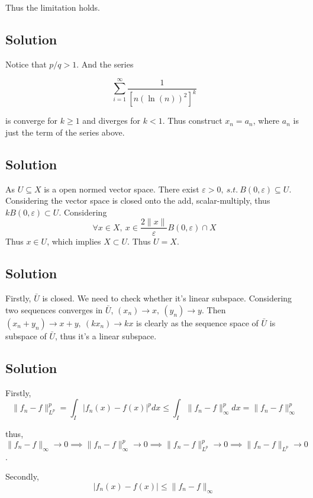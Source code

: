 \documentclass{article}
\begin{document}
Thus the limitation holds.

\subsection{Solution}
Notice that \(p/q > 1\). And the series

\[\sum_{i = 1}^\infty \frac{1}{[n(\ln(n))^2]^k}\]

is converge for \(k \ge 1\) and diverges for \(k < 1\). Thus construct \(x_n = a_n\), where \(a_n\) is just the term of the series above.


\subsection{Solution}
As \(U \subseteq X\) is a open normed vector space. There exist \(\varepsilon > 0,\ s.t.\ B(0, \varepsilon) \subseteq U\). Considering the vector space is closed onto the add, scalar-multiply, thus \(k B(0, \varepsilon) \subset U\). Considering
\[\forall x \in X,\ x \in \frac{2\|x\|}{\varepsilon}B(0, \varepsilon) \cap X\]
Thus \(x \in U\), which implies \(X \subset U\). Thus \(U = X\).


\subsection{Solution}
Firstly, \(\bar U\) is closed. We need to check whether it's linear subspace. Considering two sequences converges in \(\bar U\), \((x_n) \to x,\ (y_n) \to y\). Then \((x_n + y_n) \to x + y,\ (k x_n) \to kx\) is clearly as the sequence space of \(\bar U\) is subspace of \(\bar U\), thus it's a linear subspace. 



\subsection{}

\subsection{Solution}
Firstly,
\[\|f_n - f\|_{L^p}^p = \int_I |f_n(x) - f(x)|^p dx \le \int_I \|f_n - f\|_{\infty}^p dx = \|f_n - f\|_\infty^p\]

thus, \(\|f_n - f\|_{\infty} \to 0 \implies \|f_n - f\|_{\infty}^p \to 0 \implies \|f_n - f\|_{L^p}^p \to 0 \implies \|f_n - f\|_{L^p} \to 0\).

Secondly,
\[|f_n(x) - f(x)| \le \|f_n - f\|_{\infty}\]
\end{document}
